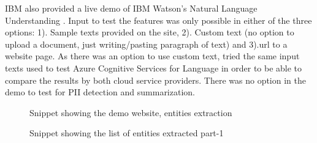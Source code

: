 IBM also provided a live demo of IBM Watson's Natural Language Understanding \cite{ibmdemo}. Input to test the features was only possible in either of the three options: 1). Sample texts provided on the site, 2). Custom text (no option to upload a document, just writing/pasting paragraph of text) and 3).\acs{url} to a website page.
As there was an option to use custom text, tried the same input texts used to test Azure Cognitive Services for Language in order to be able to compare the results by both cloud service providers.
There was no option in the demo to test for \acs{PII} detection and summarization. 
\begin {figure}[h!h]
        \centering
        \caption{Snippet showing the demo website, entities extraction}
        \label{ibmnerip}
    \end {figure}
\begin {figure}[h!h]
        \centering
        \caption{Snippet showing the list of entities extracted part-1}
        \label{ibmnerop1}
    \end {figure}
\newpage

